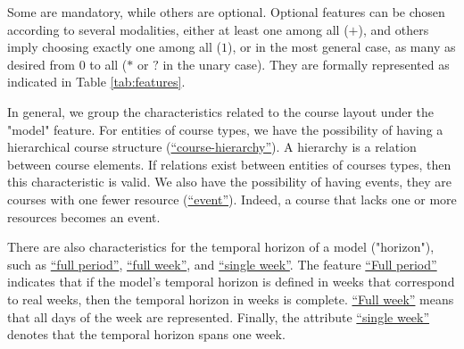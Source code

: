 Some are mandatory, while others are optional. Optional features can be chosen according to several modalities, either at least one among all ($+$), and others imply choosing exactly one among all ($1$), or in the most general case, as many as desired from 0 to all ($*$ or $?$ in the unary case). They are formally represented as indicated in Table \ref{tab:features}.


In general, we group the characteristics related to the course layout under the "model" feature. For entities of course types, we have the possibility of having a hierarchical course structure (\hyperref[featmodel:hierarchy]{``course-hierarchy''}). A hierarchy is a relation between course elements. If relations exist between entities of courses types, then this characteristic is valid. %
We also have the possibility of having events, they are courses with one fewer resource 
(\hyperref[featmodel:event]{``event''}). Indeed, a course that lacks one or more resources becomes an event.



There are also characteristics for the temporal horizon of a model ("horizon"), such as \hyperref[featmodel:fullperiod]{``full period''}, \hyperref[featmodel:fullweek]{``full week''}, and \hyperref[featmodel:singleweek]{``single week''}. The feature \hyperref[featmodel:fullperiod]{``Full period''} indicates that if the model's temporal horizon is defined in weeks that correspond to real weeks, then the temporal horizon in weeks is complete. \hyperref[featmodel:fullweek]{``Full week''} means that all days of the week are represented. Finally, the attribute \hyperref[featmodel:singleweek]{``single week''} denotes that the temporal horizon spans one week.%


